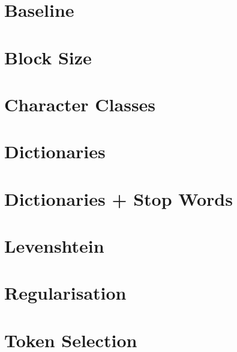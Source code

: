 \section{Baseline}

\section{Block Size}


\section{Character Classes}

\section{Dictionaries}

\section{Dictionaries + Stop Words}

\section{Levenshtein}

\section{Regularisation}

\section{Token Selection}